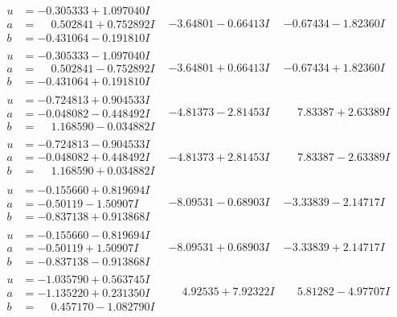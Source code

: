 \documentclass[1p]{elsarticle_modified}
\theoremstyle{definition}
\begin{document}
$$\begin{array}{c|c|c}
\begin{aligned}
u &= -0.305333 + 1.097040 I \\
a &= \phantom{-}0.502841 + 0.752892 I \\
b &= -0.431064 - 0.191810 I\end{aligned}
 & -3.64801 - 0.66413 I & -0.67434 - 1.82360 I \\ \hline\begin{aligned}
u &= -0.305333 - 1.097040 I \\
a &= \phantom{-}0.502841 - 0.752892 I \\
b &= -0.431064 + 0.191810 I\end{aligned}
 & -3.64801 + 0.66413 I & -0.67434 + 1.82360 I \\ \hline\begin{aligned}
u &= -0.724813 + 0.904533 I \\
a &= -0.048082 - 0.448492 I \\
b &= \phantom{-}1.168590 - 0.034882 I\end{aligned}
 & -4.81373 - 2.81453 I & \phantom{-}7.83387 + 2.63389 I \\ \hline\begin{aligned}
u &= -0.724813 - 0.904533 I \\
a &= -0.048082 + 0.448492 I \\
b &= \phantom{-}1.168590 + 0.034882 I\end{aligned}
 & -4.81373 + 2.81453 I & \phantom{-}7.83387 - 2.63389 I \\ \hline\begin{aligned}
u &= -0.155660 + 0.819694 I \\
a &= -0.50119 - 1.50907 I \\
b &= -0.837138 + 0.913868 I\end{aligned}
 & -8.09531 - 0.68903 I & -3.33839 - 2.14717 I \\ \hline\begin{aligned}
u &= -0.155660 - 0.819694 I \\
a &= -0.50119 + 1.50907 I \\
b &= -0.837138 - 0.913868 I\end{aligned}
 & -8.09531 + 0.68903 I & -3.33839 + 2.14717 I \\ \hline\begin{aligned}
u &= -1.035790 + 0.563745 I \\
a &= -1.135220 + 0.231350 I \\
b &= \phantom{-}0.457170 - 1.082790 I\end{aligned}
 & \phantom{-}4.92535 + 7.92322 I & \phantom{-}5.81282 - 4.97707 I \\ \hline\begin{aligned}

\end{aligned}
\end{array}$$
\end{document}
